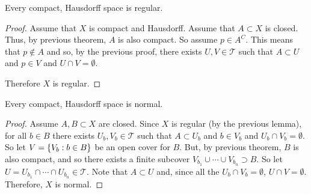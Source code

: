 \documentclass[letterpaper,12pt,fleqn]{article}
\newcommand{\T}{\mathscr{T}}
\begin{document}
\begin{lemma}
  Every compact, Hausdorff space is regular.
\end{lemma}

\begin{proof}
  Assume that \(X\) is compact and Hausdorff.  Assume that \(A\subset X\) is closed.  Thus, by previous theorem,
  \(A\) is also compact.  So assume \(p\in A^C\).  This means that \(p\notin A\) and so, by the previous proof,
  there exists \(U,V\in\T\) such that \(A\subset U\) and \(p\in V\) and \(U\cap V=\emptyset\).

  Therefore \(X\) is regular.
\end{proof}

\begin{theorem}[6.12]
  Every compact, Hausdorff space is normal.
\end{theorem}

\begin{proof}
  Assume \(A,B\subset X\) are closed.  Since \(X\) is regular (by the previous lemma), for all \(b\in B\) there
  exists \(U_b,V_b\in\T\) such that \(A\subset U_b\) and \(b\in V_b\) and \(U_b\cap V_b=\emptyset\).  So let
  \(V=\{V_b:b\in B\}\) be an open cover for \(B\).  But, by previous theorem, \(B\) is also compact, and so
  there exists a finite subcover \(V_{b_1}\cup\cdots\cup V_{b_n}\supset B\).  So let
  \(U=U_{b_1}\cap\cdots\cap U_{b_n}\in\T\).  Note that \(A\subset U\) and, since all the \(U_b\cap V_b=\emptyset\),
  \(U\cap V=\emptyset\).  Therefore, \(X\) is normal.
\end{proof}
\end{document}
